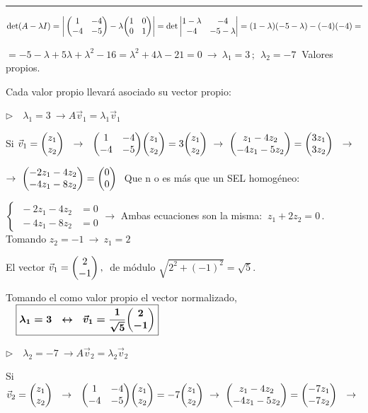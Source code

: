 \rule{200pt}{0.1pt}

$\det(A-\lambda I)=\left| \,\mqty(1&-4\\-4&-5) - \lambda \mqty(1&0\\0&1) \right|=\det \left| \mqty{1-\lambda & -4\\-4& -5-\lambda} \right|=  (1-\lambda)(-5-\lambda)-(-4)(-4) =  $

$=-5-\lambda+5\lambda+\lambda^2-16=\lambda^2+4\lambda-21=0 \ \to \ \lambda_1=3\, ; \ \ \lambda_2=-7\ $ Valores propios.

Cada valor propio llevará asociado su vector propio:

\vspace{5mm} $\triangleright \quad \boxed{\lambda_1=3} \ \to A\vec v_1=\lambda_1 \vec v_1$

Si $\vec v_1=\mqty(z_1\\z_2) \ \ \to \ \ \mqty(1&-4\\-4&-5)\mqty(z_1\\z_2)=3\mqty(z_1\\z_2) \ \to \ \mqty(z_1-4z_2\\-4z_1-5z_2)=\mqty(3z_1\\3z_2) \ \ \to \ $

$\to \  \mqty(-2z_1-4z_2\\-4z_1-8z_2)=\mqty(0\\0)\ $ Que n o es más que un  SEL homogéneo:

$\begin{cases} \ -2z_1-4z_2 & =0 \\ \ -4z_1-8z_2 &=0 \end{cases} \to $ Ambas ecuaciones son la misma: $\ z_1+2z_2=0 \, .  \ $ Tomando $z_2=-1 \ \to \ z_1=2$

El vector $\vec v_1=\mqty(2\\-1)\, , \ $ de módulo $\sqrt{2^2+(-1)^2}=\sqrt{5}$. 

Tomando el como valor propio el vector normalizado, 
$\quad \boxed{\boldsymbol{ \lambda_1= 3 \ \ \leftrightarrow \ \  \vec v_1=\dfrac{1}{\sqrt{5}} \mqty(2\\-1)}}$

\vspace{5mm} $\triangleright \quad \boxed{\lambda_2=-7} \ \to A\vec v_2=\lambda_2 \vec v_2$

Si $\vec v_2=\mqty(z_1\\z_2) \ \ \to \ \ \mqty(1&-4\\-4&-5)\mqty(z_1\\z_2)=-7\mqty(z_1\\z_2) \ \to \ \mqty(z_1-4z_2\\-4z_1-5z_2)=\mqty(-7z_1\\-7z_2) \ \ \to \ $

